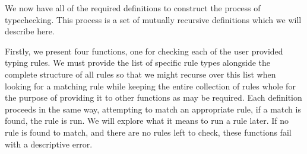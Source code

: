 We now have all of the required definitions to construct the process of
typechecking. This process is a set of mutually recursive definitions which
we will describe here.

Firstly, we present four functions, one for checking each of the user
provided typing rules. We must provide the list of specific rule types
alongside the complete structure of all rules so that we might recurse
over this list when looking for a matching rule while keeping the entire
collection of rules whole for the purpose of providing it to other
functions as may be required. Each definition proceeds in the same way,
attempting to match an appropriate rule, if a match is found, the rule is
run. We will explore what it means to run a rule later. If no rule is
found to match, and there are no rules left to check, these functions
fail with a descriptive error.

